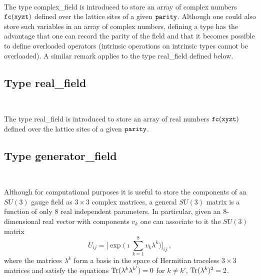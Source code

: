 \vskip 4mm
{\baselineskip 5mm \tt
{}
}

The type complex\_field is introduced to store an array of complex
numbers $\tt fc(xyzt)$ defined over the lattice sites
of a given $\tt parity$. Although one could also store such variables
in an array of complex numbers, defining a type has the advantage
that one can record the parity of the field and that it becomes possible
to define overloaded operators (intrinsic operations on intrinsic
types cannot be overloaded).  A similar remark applies to the
type real\_field defined below.

\subsection{Type real\_field}         
\label{typer}
                                         
\vskip 4mm
{\baselineskip 5mm \tt
{}
}

The type real\_field is introduced to store an array of real
numbers $\tt fc(xyzt)$ defined over the lattice sites
of a given $\tt parity$.

\subsection{Type generator\_field}    
\label{typege}
                                         
\vskip 4mm
{\baselineskip 5mm \tt
{}
}

Although for computational purposes it is useful to store the components
of an $SU(3)$ gauge field as $3 \times 3$ complex matrices, a general
$SU(3)$ matrix is a function of only 8 real independent parameters. 
In particular, given an 8-dimensional real vector with components
$v_k$ one can associate to it the $SU(3)$ matrix
%
\begin{equation}
U_{ij}= \bigg[\exp \big( \imath \sum_{k=1}^8  v_k \lambda^k \big)
 \bigg]_{ij} \ , 
\label{expv}
\end{equation}
%
where the matrices $\lambda^k$ form a basis in the space 
of Hermitian traceless $3 \times 3$ matrices and satisfy the
equations ${\rm Tr} (\lambda^k  \lambda^{k'}) = 0$ for
$k \ne k'$, ${\rm Tr} (\lambda^k)^2 = 2$.


